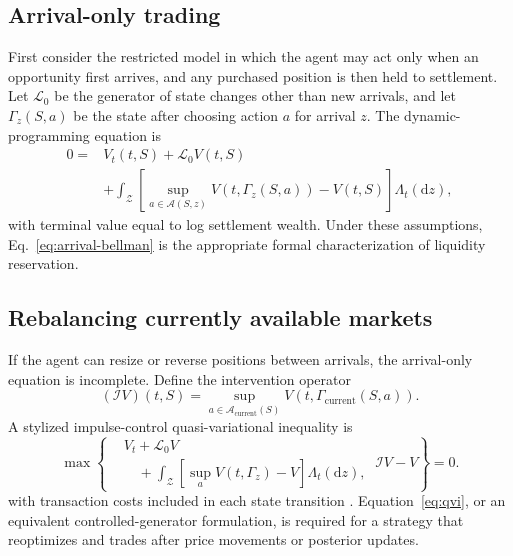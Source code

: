 \documentclass[journal,a4paper]{IEEEtran}
\begin{document}
\subsection{Arrival-only trading}
First consider the restricted model in which the agent may act only when an opportunity first arrives, and any purchased position is then held to settlement. Let $\mathcal{L}_0$ be the generator of state changes other than new arrivals, and let $\Gamma_z(S,a)$ be the state after choosing action $a$ for arrival $z$. The dynamic-programming equation is
\begin{equation}
\begin{split}
0={}&V_t(t,S)+\mathcal{L}_0V(t,S)\\
&+\int_{\mathcal{Z}}
\left[
\sup_{a\in\mathcal{A}(S,z)}
V(t,\Gamma_z(S,a))-V(t,S)
\right]
\Lambda_t(\mathrm{d}z),
\end{split}
\label{eq:arrival-bellman}
\end{equation}
with terminal value equal to log settlement wealth. Under these assumptions, Eq.~\eqref{eq:arrival-bellman} is the appropriate formal characterization of liquidity reservation.

\subsection{Rebalancing currently available markets}
If the agent can resize or reverse positions between arrivals, the arrival-only equation is incomplete. Define the intervention operator
\begin{equation}
(\mathcal{I}V)(t,S)
=
\sup_{a\in\mathcal{A}_{\mathrm{current}}(S)}
V(t,\Gamma_{\mathrm{current}}(S,a)).
\label{eq:intervention-operator}
\end{equation}
A stylized impulse-control quasi-variational inequality is
\begin{equation}
\max\left\{
\begin{aligned}
&V_t+\mathcal{L}_0V\\
&\quad+\int_{\mathcal{Z}}
[\sup_a V(t,\Gamma_z)-V]\Lambda_t(\mathrm{d}z),
\end{aligned}
\ \mathcal{I}V-V
\right\}=0.
\label{eq:qvi}
\end{equation}
with transaction costs included in each state transition \cite{davis1993,oksendal2019}. Equation~\eqref{eq:qvi}, or an equivalent controlled-generator formulation, is required for a strategy that reoptimizes and trades after price movements or posterior updates.
\end{document}
